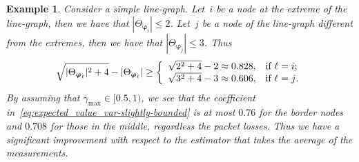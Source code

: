 \documentclass[a4paper,notitlepage,onecolumn]{article}
\def\varphib{\boldsymbol{\varphi}}
\newtheorem{example}[theorem]{Example}
\numberwithin{equation}{section}
\begin{document}
\begin{example}
Consider a simple line-graph. Let~$i$ be a node at the extreme of
the line-graph, then we have that $|\Theta_{\varphib_i}| \leq 2$.
Let~$j$ be a node of the line-graph different from the extremes,
then we have that $|\Theta_{\varphib_j}| \leq 3$. Thus
$$
    \sqrt{|\Theta_{\varphib_\ell}|^2+4} - |\Theta_{\varphib_\ell}| \geq
\left\{
  \begin{array}{ll}
    \sqrt{2^2+4}-2 \approx 0.828, & \hbox{if $\ell =i$;} \\
    \sqrt{3^2+4}-3 \approx 0.606, & \hbox{if $\ell =j$.}
  \end{array}
\right.
$$
By assuming that $\gamma_{\max} \in [0.5,1)$, we see that the
coefficient in~\eqref{eq:expected_value_var-slightly-bounded} is
at most $0.76$ for the border nodes and $0.708$ for those in the
middle, regardless the packet losses. Thus we have a significant
improvement with respect to the estimator that takes the average
of the measurements.



\end{example}
\end{document}
